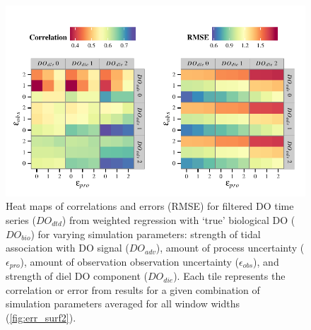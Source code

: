 \documentclass[letterpaper,12pt,oneside]{article}\usepackage[]{graphicx}\usepackage[]{color}
\makeatletter
\def\maxwidth{ %
  \ifdim\Gin@nat@width>\linewidth
    \linewidth
  \else
    \Gin@nat@width
  \fi
}
\newenvironment{knitrout}{}{} %
\makeatother
\begin{document}
\centering\vspace*{\fill}
\begin{knitrout}
\color{fgcolor}\begin{figure}[!ht]


{\centering \includegraphics[width=\maxwidth]{figure/err_surf1} 

}

\caption[Heat maps of correlations and errors (\ac{RMSE}) for filtered \ac{DO} time series ($DO_{dtd}$) from weighted regression with `true' biological \ac{DO} ($DO_{bio}$) for varying simulation parameters]{Heat maps of correlations and errors (\ac{RMSE}) for filtered \ac{DO} time series ($DO_{dtd}$) from weighted regression with `true' biological \ac{DO} ($DO_{bio}$) for varying simulation parameters: strength of tidal association with \ac{DO} signal ($DO_{adv}$), amount of process uncertainty ($\epsilon_{pro}$), amount of observation observation uncertainty ($\epsilon_{obs}$), and strength of diel \ac{DO} component ($DO_{die}$).  Each tile represents the correlation or error from results for a given combination of simulation parameters averaged for all window widths (\cref{fig:err_surf2}).\label{fig:err_surf1}}
\end{figure}


\end{knitrout}
\vfill
\clearpage
\end{document}

